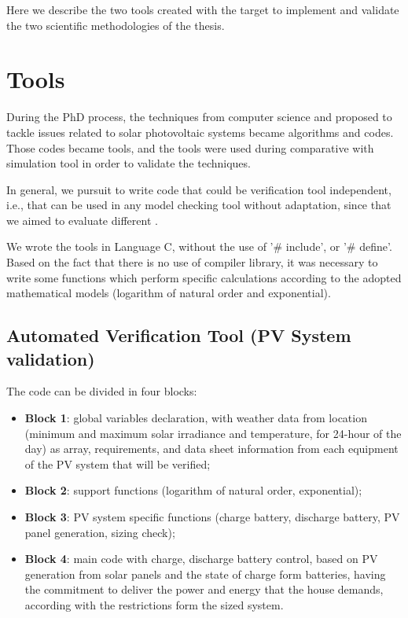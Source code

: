 Here we describe the two tools created with the target to implement and validate the two scientific methodologies of the thesis.

\section{Tools}

During the PhD process, the techniques from computer science and proposed to tackle issues related to solar photovoltaic systems became algorithms and codes. Those codes became tools, and the tools were used during comparative with simulation tool in order to validate the techniques.

In general, we pursuit to write code that could be verification tool independent, i.e., that can be used in any model checking tool without adaptation, since that we aimed to evaluate different .

We wrote the tools in Language C, without the use of '\# include', or '\# define'. Based on the fact that there is no use of compiler library, it was necessary to write some functions which perform specific calculations according to the adopted mathematical models (logarithm of natural order and exponential).

\subsection{Automated Verification Tool (PV System validation)}
\label{sec:automatedverification}

The code can be divided in four blocks:

\begin{itemize}
\item \textbf{Block 1}: global variables declaration, with weather data from location (minimum and maximum solar irradiance and temperature, for 24-hour of the day) as array, requirements, and data sheet information from each equipment of the PV system that will be verified; 

\item \textbf{Block 2}: support functions (logarithm of natural order, exponential);

\item \textbf{Block 3}: PV system specific functions (charge battery, discharge battery, PV panel generation, sizing check);

\item \textbf{Block 4}: main code with charge, discharge battery control, based on PV generation from solar panels and the state of charge form batteries, having the commitment to deliver the power and energy that the house demands, according with the restrictions form the sized system.
\end{itemize}

